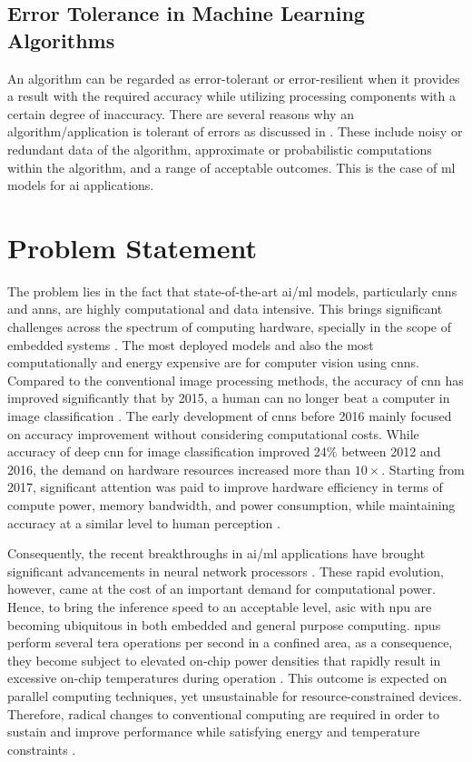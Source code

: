 \subsection{Error Tolerance in Machine Learning Algorithms}
An algorithm can be regarded as error-tolerant or error-resilient when it provides a result with the required accuracy while utilizing processing components with a certain degree of inaccuracy. There are several reasons why an algorithm/application is tolerant of errors as discussed in \cite{chippa2013analysis}. These include noisy or redundant data of the algorithm, approximate or probabilistic computations within the algorithm, and a range of acceptable outcomes. This is the case of \gls{ml} models for \gls{ai} applications.

\section{Problem Statement}
The problem lies in the fact that state-of-the-art \gls{ai}/\gls{ml} models, particularly \glspl{cnn} and \glspl{ann}, are highly computational and data intensive. This brings significant challenges across the spectrum of computing hardware, specially in the scope of embedded systems \cite{venkataramani2016efficient}. The most deployed models and also the most computationally and energy expensive are for computer vision using \glspl{cnn}. Compared to the conventional image processing methods, the accuracy of \gls{cnn} has improved significantly that by 2015, a human can no longer beat a computer in image classification \cite{loh20201}. The early development of \glspl{cnn} before 2016 mainly focused on accuracy improvement without considering computational costs. While accuracy of deep \gls{cnn} for image classification improved 24\% between 2012 and 2016, the demand on hardware resources increased more than $10\times$. Starting from 2017, significant attention was paid to improve hardware efficiency in terms of compute power, memory bandwidth, and power consumption, while maintaining accuracy at a similar level to human perception \cite{venkataramani2016efficient}.

Consequently, the recent breakthroughs in \gls{ai}/\gls{ml} applications have brought significant advancements in neural network processors \cite{jouppi2017datacenter}. These rapid evolution, however, came at the cost of an important demand for computational power. Hence, to bring the inference speed to an acceptable level, \gls{asic} with \gls{npu} are becoming ubiquitous in both embedded and general purpose computing. \glspl{npu} perform several tera operations per second in a confined area, as a consequence, they become subject to elevated on-chip power densities that rapidly result in excessive on-chip temperatures during operation \cite{amrouch2020npu}. This outcome is expected on parallel computing techniques, yet unsustainable for resource-constrained devices.
Therefore, radical changes to conventional computing are required in order to sustain and improve performance while satisfying energy and temperature constraints \cite{gillani2020exploiting}.


